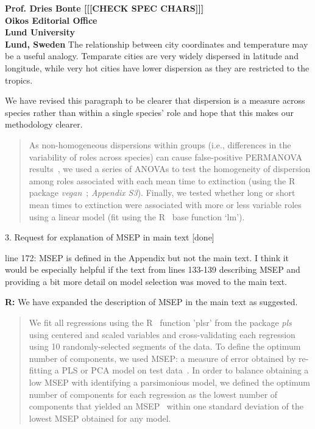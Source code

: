 \documentclass[12pt]{letter}
\begin{document}
\begin{letter}{\bf Prof. Dries Bonte [[[CHECK SPEC CHARS]]]\\
Oikos Editorial Office \\
Lund University \\
Lund, Sweden}
    The relationship between city coordinates and temperature may be a useful analogy. Temparate cities are very widely dispersed in latitude and longitude, while very hot cities have lower dispersion as they are restricted to the tropics.


    We have revised this paragraph to be clearer that dispersion is a measure across species rather than within a single species' role and hope that this makes our methodology clearer.


    \begin{quotation}

            As non-homogeneous dispersions within groups (i.e., differences in the variability of roles across species) can cause false-positive PERMANOVA results~\citep{Anderson2001}, we used a series of ANOVAs to test the homogeneity of dispersion among roles associated with each mean time to extinction (using the R~\citep{R} package \emph{vegan}~\citep{vegan}; \emph{Appendix S3}).
            Finally, we tested whether long or short mean times to extinction were associated with more or less variable roles  using a linear model (fit using the R~\citep{R} base function `lm').

    \end{quotation}    


  3. Request for explanation of MSEP in main text [done]

    line 172: MSEP is defined in the Appendix but not the main text. I think it would be especially helpful if the text from lines 133-139 describing MSEP and providing a bit more detail on model selection was moved to the main text.

    \textbf{R:} We have expanded the description of MSEP in the main text as suggested.

    \begin{quotation}

          We fit all regressions using the R~\citep{R} function 'plsr' from the package \emph{pls}~\citep{pls} using centered and scaled variables and cross-validating each regression using 10 randomly-selected segments of the data.
          To define the optimum number of components, we used MSEP: a measure of error obtained by re-fitting a PLS or PCA model on test data~\citep{Mevik2004}.
          In order to balance obtaining a low MSEP with identifying a parsimonious model, we defined the optimum number of components for each regression as the lowest number of components that yielded an MSEP~\citep{Mevik2004} within one standard deviation of the lowest MSEP obtained for any model.


\end{quotation}
\end{letter}
\end{document}
